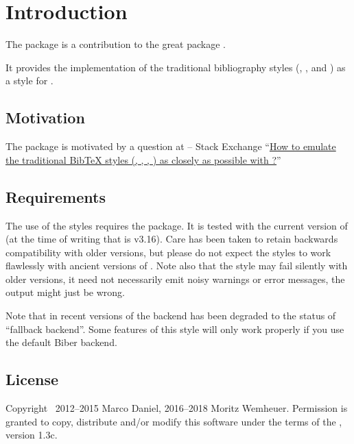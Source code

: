 \documentclass{ltxdockit}[2011/03/25]
\begin{document}
\printtitlepage
\tableofcontents


\section{Introduction}\label{sec:int}

The package  is a contribution to the great package .

It provides the implementation of the traditional bibliography styles (,
,  and ) as a style for .

\subsection{Motivation}\label{subsec:int:mot}

The package is motivated by a question at \tex{} -- \latex Stack Exchange
\enquote{\href{http://tex.stackexchange.com/a/69706/}{How to emulate the traditional BibTeX styles
(, , , ) as closely as possible with ?}}

\subsection{Requirements}
The use of the styles requires the  package.
It is tested with the current version of  (at the time of writing that is v3.16).
Care has been taken to retain backwards compatibility with older versions,
but please do not expect the styles to work flawlessly with ancient versions of .
Note also that the style may fail silently with older versions, it need not necessarily emit noisy
warnings or error messages, the output might just be wrong.

Note that in recent versions of  the \bibtex backend has been degraded to
the status of \enquote{fallback backend}.
Some features of this style will only work properly if you use the default Biber backend.

\subsection{License}

Copyright \textcopyright\ 2012--2015 Marco Daniel, 2016--2018 Moritz Wemheuer. Permission is granted to copy, distribute and\slash or modify this software under the terms of the \lppl, version 1.3c.
\end{document}
